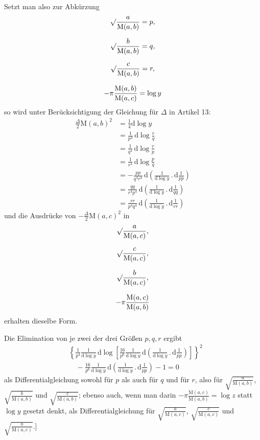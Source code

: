 \par Setzt man also zur Abkürzung
\[
\begin{gathered}\surd\frac{a}{\mathrm M(a,b)}=p,\\[7pt]
\surd\frac{b}{\mathrm M(a,b)}=q,\\[7pt]
\surd\frac{c}{\mathrm M(a,b)}=r,\\[7pt]
-\pi\frac{\mathrm M(a,b)}{\mathrm M(a,c)}=\log y\end{gathered}
\]
so wird unter Berücksichtigung der Gleichung für $\Delta$ in Artikel 13:
\[
\begin{aligned}
\displaystyle\frac{\Delta}{2}\mathrm M(a,b)^2
&=\displaystyle\frac14\mathrm d\log y\\&=\frac{1}{p^4}\,\mathrm d\log\frac{r}{q}\\&=\frac{1}{q^4}\,\mathrm d\log\frac{r}{p}\\&=\frac{1}{r^4}\,\mathrm d\log\frac{p}{q}\\[8pt]
&=\displaystyle-\frac{pp}{q^4r^4}\,\mathrm d
\left(\frac{1}{\mathrm d\log y}\mathbin{.}\mathrm d\frac{1}{pp}\right)\\&=\frac{qq}{r^4p^4}\,\mathrm d
\left(\frac{1}{\mathrm d\log y}\mathbin{.}\mathrm d\frac{1}{qq}\right)\\&=\frac{rr}{p^4q^4}\,\mathrm d
\left(\frac{1}{\mathrm d\log y}\mathbin{.}\mathrm d\frac{1}{rr}\right)
\end{aligned}
\]
und die Ausdrücke von $-\frac{\Delta}{2}\mathrm M(a,c)^2$ in
\[
\begin{gathered}\surd\frac{a}{\mathrm M(a,c)},\\[7pt]
\surd\frac{c}{\mathrm M(a,c)},\\[7pt]
\surd\frac{b}{\mathrm M(a,c)},\\[7pt]
-\pi\frac{\mathrm M(a,c)}{\mathrm M(a,b)}\end{gathered}
\]
erhalten dieselbe Form.
\par Die Elimination von je zwei der drei Größen $p,q,r$ ergibt
\[
\begin{aligned}&\left\{\frac{1}{p^4}\frac{1}{\mathrm d\log y}\,\mathrm d\log
\left[\frac{16}{p^6}\frac{1}{\mathrm d\log y}\,\mathrm d
\left(\frac{1}{\mathrm d\log y}\mathbin{.}\mathrm d\frac{1}{pp}\right)\right]\right\}^{2}\\&\quad-\frac{16}{p^6}\frac{1}{\mathrm d\log y}\,\mathrm d
\left(\frac{1}{\mathrm d\log y}\mathbin{.}\mathrm d\frac{1}{pp}\right)-1=0\end{aligned}
\]
%
als Differentialgleichung sowohl für $p$ als auch für $q$ und für $r$, also für
$\surd{\frac{a}{\mathrm M(a,b)}}$, $\surd{\frac{b}{\mathrm M(a,b)}}$ und
$\surd{\frac{c}{\mathrm M(a,b)}}$; ebenso auch, wenn man darin
$-\pi\frac{\mathrm M(a,c)}{\mathrm M(a,b)}=\log z$ statt $\log y$ gesetzt denkt,
als Differentialgleichung für $\surd{\frac{a}{\mathrm M(a,c)}}$,
$\surd{\frac{c}{\mathrm M(a,c)}}$ und $\surd{\frac{b}{\mathrm M(a,c)}}$.]

